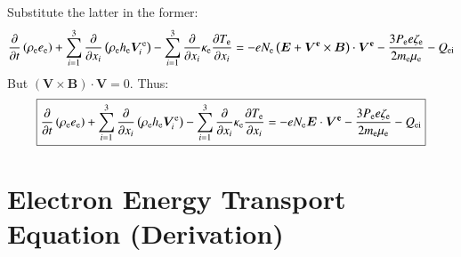 \documentclass{warpdoc}
\newcommand\frameeqn[1]{\fbox{$\displaystyle #1$}}
\renewcommand{\vec}[1]{\bm{#1}}
\begin{document}
%
Substitute the latter in the former:
%
\begin{equation}
  \frac{\partial }{\partial t} \left( \rho_{\rm e} e_{\rm e} \right)
  + \sum_{i=1}^3 \frac{\partial }{\partial x_i} \left(\rho_{\rm e} h_{\rm e} \vec{V}_i^{\rm e} \right)
  - \sum_{i=1}^3 \frac{\partial }{\partial x_i} \kappa_{\rm e} \frac{\partial T_{\rm e}}{\partial x_i}
  =
 - e N_{\rm e}\left(\vec{E} + \vec{V^{\rm e}} \times \vec{B}\right) \cdot \vec{V^{\rm e}}
 -    \frac{3 P_{\rm e}  e \zeta_{\rm e}}{2 m_{\rm e}\mu_{\rm e}} - Q_{\rm ei}  
 \end{equation}
%
But $(\vec{V}\times\vec{B})\cdot\vec{V}=0$. Thus:
%
\begin{equation}
\frameeqn{
  \frac{\partial }{\partial t} \left( \rho_{\rm e} e_{\rm e} \right)
  + \sum_{i=1}^3 \frac{\partial }{\partial x_i} \left(\rho_{\rm e} h_{\rm e} \vec{V}_i^{\rm e} \right)
  - \sum_{i=1}^3 \frac{\partial }{\partial x_i} \kappa_{\rm e} \frac{\partial T_{\rm e}}{\partial x_i}
  =
 - e N_{\rm e} \vec{E} \cdot \vec{V^{\rm e}}
 -    \frac{3 P_{\rm e}  e \zeta_{\rm e}}{2 m_{\rm e}\mu_{\rm e}} - Q_{\rm ei}  
}
\label{eqn:eenergy_raizer}
 \end{equation}
%




\section{Electron Energy Transport Equation (Derivation)}
\end{document}
